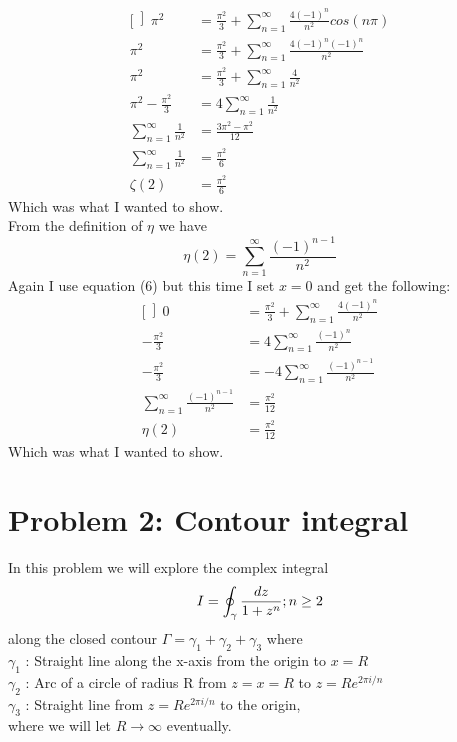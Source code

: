 \documentclass[a4paper,12pt]{article}
\begin{document}
\begin{equation*}
\begin{aligned}[\left]
\pi^2 &= \frac{\pi^2}{3} + \sum_{n=1}^{\infty}\frac{4(-1)^n}{n^2}cos(n\pi)\\
\pi^2 &= \frac{\pi^2}{3} + \sum_{n=1}^{\infty}\frac{4(-1)^n(-1)^n}{n^2}\\
\pi^2 &= \frac{\pi^2}{3} + \sum_{n=1}^{\infty}\frac{4}{n^2}\\
\pi^2 - \frac{\pi^2}{3} &=  4\sum_{n=1}^{\infty}\frac{1}{n^2}\\
\sum_{n=1}^{\infty}\frac{1}{n^2} &=  \frac{3\pi^2 - \pi^2}{12}\\
\sum_{n=1}^{\infty}\frac{1}{n^2} &=  \frac{\pi^2}{6}\\
\zeta(2) &= \frac{\pi^2}{6}
\end{aligned}
\end{equation*}
Which was what I wanted to show.\\
From the definition of $\eta$ we have
$$\eta(2) = \sum_{n=1}^{\infty}\frac{(-1)^{n-1}}{n^2}$$
Again I use equation (6) but this time I set $x = 0$ and get the following:
\begin{equation*}
\begin{aligned}[\left]
0 &= \frac{\pi^2}{3} + \sum_{n=1}^{\infty}\frac{4(-1)^n}{n^2}\\
-\frac{\pi^2}{3} &=  4\sum_{n=1}^{\infty}\frac{(-1)^n}{n^2}\\
-\frac{\pi^2}{3} &=  -4\sum_{n=1}^{\infty}\frac{(-1)^{n-1}}{n^2}\\
\sum_{n=1}^{\infty}\frac{(-1)^{n-1}}{n^2} &=  \frac{\pi^2}{12}\\
\eta(2) &= \frac{\pi^2}{12}
\end{aligned}
\end{equation*}
Which was what I wanted to show.

\section{Problem 2: Contour integral}
In this problem we will explore the complex integral
\begin{equation}
I = \oint_\gamma \frac{dz}{1+z^n}; n \geq 2 \\
\end{equation}
along the closed contour $\Gamma = \gamma_1 + \gamma_2 + \gamma_3$ where\\
$\gamma_1$ : Straight line along the x-axis from the origin to $x = R$\\
$\gamma_2$ : Arc of a circle of radius R from $z = x = R$ to $z = R e^{2\pi i/n}$\\
$\gamma_3$ : Straight line from $z = Re^{2\pi i/n}$ to the origin,\\
where we will let $R \rightarrow \infty$ eventually.
\end{document}
